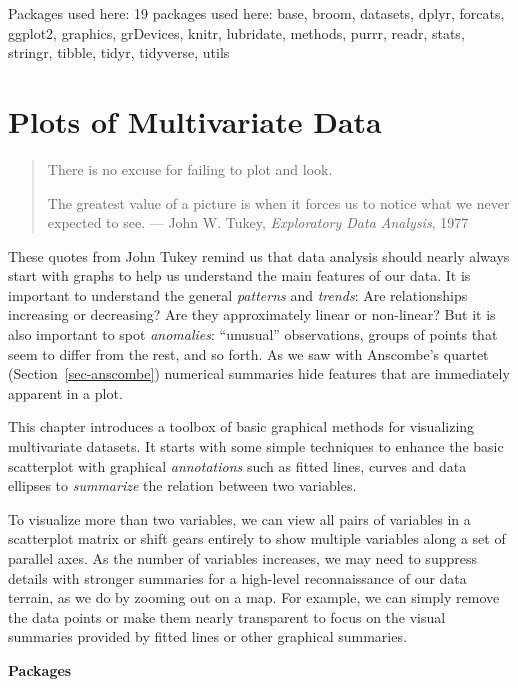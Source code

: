 \documentclass[
  letterpaper,
  10pt,
  krantz2]{krantz}
\begin{document}
Packages used here: 19 packages used here: base, broom, datasets, dplyr,
forcats, ggplot2, graphics, grDevices, knitr, lubridate, methods, purrr,
readr, stats, stringr, tibble, tidyr, tidyverse, utils


\hypertarget{sec-multivariate_plots}{%
\chapter{Plots of Multivariate Data}\label{sec-multivariate_plots}}

\begin{quote}
There is no excuse for failing to plot and look.

The greatest value of a picture is when it forces us to notice what we
never expected to see. --- John W. Tukey, \emph{Exploratory Data
Analysis}, 1977
\end{quote}

These quotes from John Tukey remind us that data analysis should nearly
always start with graphs to help us understand the main features of our
data. It is important to understand the general \emph{patterns} and
\emph{trends}: Are relationships increasing or decreasing? Are they
approximately linear or non-linear? But it is also important to spot
\emph{anomalies}: ``unusual'' observations, groups of points that seem
to differ from the rest, and so forth. As we saw with Anscombe's quartet
(Section~\ref{sec-anscombe}) numerical summaries hide features that are
immediately apparent in a plot.

This chapter introduces a toolbox of basic graphical methods for
visualizing multivariate datasets. It starts with some simple techniques
to enhance the basic scatterplot with graphical \emph{annotations} such
as fitted lines, curves and data ellipses to \emph{summarize} the
relation between two variables.

To visualize more than two variables, we can view all pairs of variables
in a scatterplot matrix or shift gears entirely to show multiple
variables along a set of parallel axes. As the number of variables
increases, we may need to suppress details with stronger summaries for a
high-level reconnaissance of our data terrain, as we do by zooming out
on a map. For example, we can simply remove the data points or make them
nearly transparent to focus on the visual summaries provided by fitted
lines or other graphical summaries.

\textbf{Packages}
\end{document}
